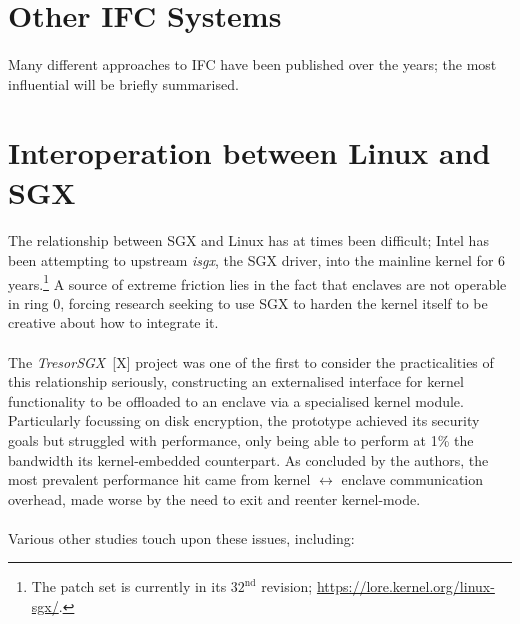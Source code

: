 \section{Other IFC Systems}
\paragraph{} Many different approaches to IFC have been published over the years; the most influential will be briefly summarised.


\section{Interoperation between Linux and SGX} 
\paragraph{} The relationship between SGX and Linux has at times been difficult; Intel has been attempting to upstream \textit{isgx}, the SGX driver, into the mainline kernel for 6 years.\footnote{The patch set is currently in its $32^{\text{nd}}$ revision; \url{https://lore.kernel.org/linux-sgx/}.} A source of extreme friction lies in the fact that enclaves are not operable in ring 0, forcing research seeking to use SGX to harden the kernel itself to be creative about how to integrate it.

\paragraph{} The \textit{TresorSGX}~[X] project was one of the first to consider the practicalities of this relationship seriously, constructing an externalised interface for kernel functionality to be offloaded to an enclave via a specialised kernel module. Particularly focussing on disk encryption, the prototype achieved its security goals but struggled with performance, only being able to perform at 1\% the bandwidth its kernel-embedded counterpart. As concluded by the authors, the most prevalent performance hit came from kernel $\leftrightarrow$ enclave communication overhead, made worse by the need to exit and reenter kernel-mode.


\paragraph{} Various other studies touch upon these issues, including:


